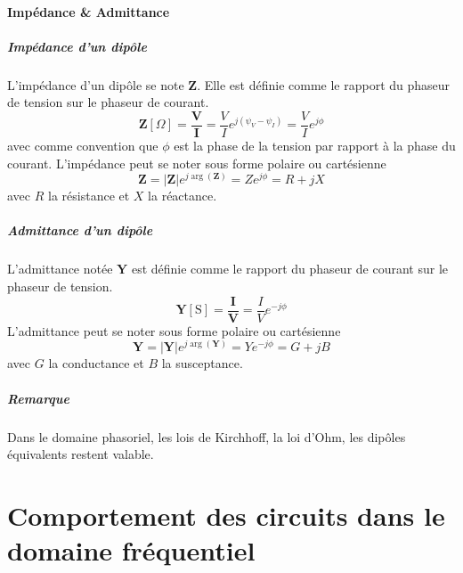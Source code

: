 \subsubsection{Impédance \& Admittance}
\paragraph{Impédance d'un dipôle}
L'impédance d'un dipôle se note $\textbf{Z}$. Elle est définie comme le rapport du phaseur de tension sur le phaseur de courant.
\begin{equation}
\textbf{Z}[\Omega]=\frac{\textbf{V}}{\textbf{I}}=\frac{V}{I}e^{j(\psi_V-\psi_I)}=\frac{V}{I}e^{j\phi}
\end{equation}
avec comme convention que $\phi$ est la phase de la tension par rapport à la phase du courant.
L'impédance peut se noter sous forme polaire ou cartésienne
\[
\textbf{Z}=|\textbf{Z}|e^{j\arg(\textbf{Z})}=Ze^{j\phi}=R+jX
\]
avec $R$ la résistance et $X$ la réactance.
\paragraph{Admittance d'un dipôle}
L'admittance notée $\textbf{Y}$ est définie comme le rapport du phaseur de courant sur le phaseur de tension.
\begin{equation}
\textbf{Y}[\text{S}]=\frac{\textbf{I}}{\textbf{V}}=\frac{I}{V}e^{-j\phi}
\end{equation}
L'admittance peut se noter sous forme polaire ou cartésienne
\[
\textbf{Y}=|\textbf{Y}|e^{j\arg(\textbf{Y})}=Ye^{-j\phi}=G+jB
\]
avec $G$ la conductance et $B$ la susceptance.

\paragraph{Remarque} Dans le domaine phasoriel, les lois de Kirchhoff, la loi d'Ohm, les dipôles équivalents restent valable.

\chapter{Comportement des circuits dans le domaine fréquentiel}
